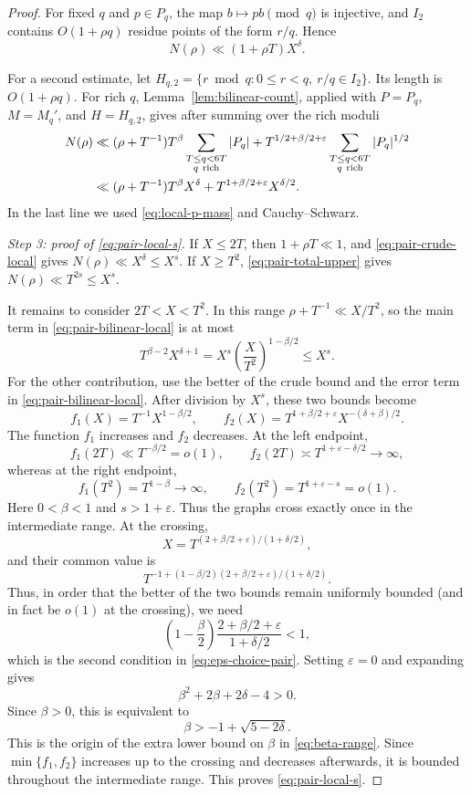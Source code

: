 \documentclass[11pt]{amsart}
\newcommand{\eps}{\varepsilon}
\begin{document}
\begin{proof}
For fixed $q$ and $p\in P_q$, the map $b\mapsto pb\pmod q$ is injective, and
$I_2$ contains $O(1+\rho q)$ residue points of the form $r/q$.  Hence
\begin{equation}\label{eq:pair-crude-local}
 N(\rho)\ll (1+\rho T)X^\delta.
\end{equation}

For a second estimate, let
$H_{q,2}=\{r\bmod q:0\le r<q,\ r/q\in I_2\}$.  Its length is $O(1+\rho q)$.
For rich $q$, Lemma~\ref{lem:bilinear-count}, applied with $P=P_q$,
$M=M_q'$, and $H=H_{q,2}$, gives after summing over the rich moduli
\begin{align}
 N(\rho)
 &\ll (\rho+T^{-1})T^\beta\sum_{\substack{T\le q<6T\\q\ \mathrm{rich}}}|P_q|
 +T^{1/2+\beta/2+\eps}\sum_{\substack{T\le q<6T\\q\ \mathrm{rich}}}|P_q|^{1/2}\notag\\
 &\ll (\rho+T^{-1})T^\beta X^\delta
 +T^{1+\beta/2+\eps}X^{\delta/2}.
 \label{eq:pair-bilinear-local}
\end{align}
In the last line we used \eqref{eq:local-p-mass} and Cauchy--Schwarz.

\medskip
\noindent\emph{Step 3: proof of \eqref{eq:pair-local-s}.}
If $X\le2T$, then $1+\rho T\ll1$, and \eqref{eq:pair-crude-local} gives
$N(\rho)\ll X^\delta\le X^s$.  If $X\ge T^2$, \eqref{eq:pair-total-upper} gives
$N(\rho)\ll T^{2s}\le X^s$.

It remains to consider $2T<X<T^2$.  In this range
$\rho+T^{-1}\ll X/T^2$, so the main term in
\eqref{eq:pair-bilinear-local} is at most
$$
 T^{\beta-2}X^{\delta+1}
 =X^s\left(\frac{X}{T^2}\right)^{1-\beta/2}
 \le X^s.
$$
For the other contribution, use the better of the crude bound and the error
term in \eqref{eq:pair-bilinear-local}.  After division by $X^s$, these two
bounds become
$$
 f_1(X)=T^{-1}X^{1-\beta/2},
 \qquad
 f_2(X)=T^{1+\beta/2+\eps}X^{-(\delta+\beta)/2}.
$$
The function $f_1$ increases and $f_2$ decreases.  At the left endpoint,
$$
 f_1(2T)\ll T^{-\beta/2}=o(1),
 \qquad
 f_2(2T)\asymp T^{1+\eps-\delta/2}\to\infty,
$$
whereas at the right endpoint,
$$
 f_1(T^2)=T^{1-\beta}\to\infty,
 \qquad
 f_2(T^2)=T^{1+\eps-s}=o(1).
$$
Here $0<\beta<1$ and $s>1+\eps$.  Thus the graphs cross exactly once in the
intermediate range.  At the crossing,
$$
 X=T^{(2+\beta/2+\eps)/(1+\delta/2)},
$$
and their common value is
$$
 T^{-1+(1-\beta/2)(2+\beta/2+\eps)/(1+\delta/2)}.
$$
Thus, in order that the better of the two bounds remain uniformly bounded
(and in fact be $o(1)$ at the crossing), we need
$$
 \left(1-\frac\beta2\right)
 \frac{2+\beta/2+\eps}{1+\delta/2}<1,
$$
which is the second condition in \eqref{eq:eps-choice-pair}.  Setting
$\eps=0$ and expanding gives
$$
 \beta^2+2\beta+2\delta-4>0.
$$
Since $\beta>0$, this is equivalent to
$$
 \beta>-1+\sqrt{5-2\delta}.
$$
This is the origin of the extra lower bound on $\beta$ in \eqref{eq:beta-range}.
Since $\min\{f_1,f_2\}$ increases up to the crossing and decreases afterwards,
it is bounded throughout the intermediate range.  This proves
\eqref{eq:pair-local-s}.


\end{proof}
\end{document}

